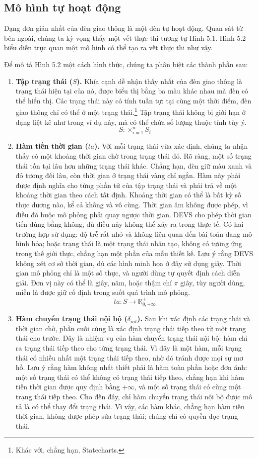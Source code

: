 \subsection{Mô hình tự hoạt động}
Dạng đơn giản nhất của đèn giao thông là một đèn tự hoạt động. Quan sát từ bên ngoài, chúng ta kỳ vọng thấy một vết thực thi tương tự Hình 5.1. Hình 5.2 biểu diễn trực quan một mô hình có thể tạo ra vết thực thi như vậy.

Để mô tả Hình 5.2 một cách hình thức, chúng ta phân biệt các thành phần sau:
\begin{enumerate}
\item \textbf{Tập trạng thái ($S$).} Khía cạnh dễ nhận thấy nhất của đèn giao thông là trạng thái hiện tại của nó, được biểu thị bằng ba màu khác nhau mà đèn có thể hiển thị. Các trạng thái này có tính tuần tự: tại cùng một thời điểm, đèn giao thông chỉ có thể ở một trạng thái.\footnote{Khác với, chẳng hạn, Statecharts.} Tập trạng thái không bị giới hạn ở dạng liệt kê như trong ví dụ này, mà có thể chứa số lượng thuộc tính tùy ý.
\[
S:\times_{i=1}^{n}S_i
\]
\item \textbf{Hàm tiến thời gian ($ta$).} Với mỗi trạng thái vừa xác định, chúng ta nhận thấy có một khoảng thời gian chờ trong trạng thái đó. Rõ ràng, một số trạng thái tồn tại lâu hơn những trạng thái khác. Chẳng hạn, đèn giữ màu xanh và đỏ tương đối lâu, còn thời gian ở trạng thái vàng chỉ ngắn. Hàm này phải được định nghĩa cho từng phần tử của tập trạng thái và phải trả về một khoảng thời gian theo cách tất định. Khoảng thời gian có thể là bất kỳ số thực dương nào, kể cả không và vô cùng. Thời gian âm không được phép, vì điều đó buộc mô phỏng phải quay ngược thời gian. DEVS cho phép thời gian tiến đúng bằng không, dù điều này không thể xảy ra trong thực tế. Có hai trường hợp sử dụng: độ trễ rất nhỏ và không liên quan đến bài toán đang mô hình hóa; hoặc trạng thái là một trạng thái nhân tạo, không có tương ứng trong thế giới thực, chẳng hạn một phần của mẫu thiết kế. Lưu ý rằng DEVS không xét cơ sở thời gian, dù các hình minh họa ở đây sử dụng giây. Thời gian mô phỏng chỉ là một số thực, và người dùng tự quyết định cách diễn giải. Đơn vị này có thể là giây, năm, hoặc thậm chí $\pi$ giây, tùy người dùng, miễn là được giữ cố định trong suốt quá trình mô phỏng.
\[
ta:S\rightarrow\mathbb{R}^{+}_{0,+\infty}
\]
\item \textbf{Hàm chuyển trạng thái nội bộ ($\delta_{int}$).} Sau khi xác định các trạng thái và thời gian chờ, phần cuối cùng là xác định trạng thái tiếp theo từ một trạng thái cho trước. Đây là nhiệm vụ của hàm chuyển trạng thái nội bộ: hàm chỉ ra trạng thái tiếp theo cho từng trạng thái. Vì đây là một hàm, mỗi trạng thái có nhiều nhất một trạng thái tiếp theo, nhờ đó tránh được mọi sự mơ hồ. Lưu ý rằng hàm không nhất thiết phải là hàm toàn phần hoặc đơn ánh: một số trạng thái có thể không có trạng thái tiếp theo, chẳng hạn khi hàm tiến thời gian được quy định bằng $+\infty$, và một số trạng thái có cùng một trạng thái tiếp theo. Cho đến đây, chỉ hàm chuyển trạng thái nội bộ được mô tả là có thể thay đổi trạng thái. Vì vậy, các hàm khác, chẳng hạn hàm tiến thời gian, không được phép sửa trạng thái; chúng chỉ có quyền đọc trạng thái.

\end{enumerate}
